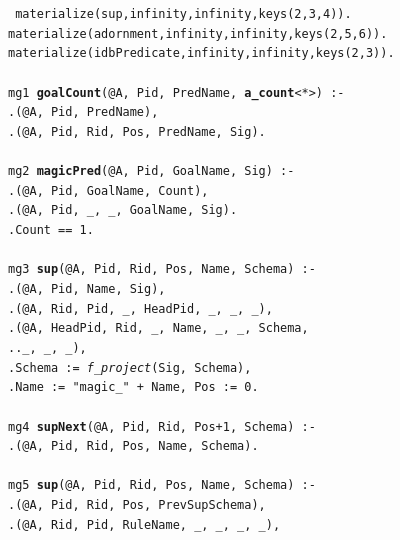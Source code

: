 \documentclass{sigmod08}
\newcommand{\datalogspace}{\textcolor[gray]{1}{.}\hspace{0.5in}}
\begin{document}
\begin{figure}[t]
\begin{boxedminipage}{\linewidth}
\scriptsize{\tt
materialize(sup,infinity,infinity,keys(2,3,4)). \\
materialize(adornment,infinity,infinity,keys(2,5,6)). \\
materialize(idbPredicate,infinity,infinity,keys(2,3)). \\
\\
mg1 {\small \bf goalCount}(@A, Pid, PredName, {\small \bf a\_count}<*>) :- \\
\datalogspace {\small \bf idbPredicate}(@A, Pid, PredName), \\
\datalogspace {\small \bf adornment}(@A, Pid, Rid, Pos, PredName, Sig). \\
\\
mg2 {\small \bf magicPred}(@A, Pid, GoalName, Sig) :- \\
\datalogspace {\small \bf goalCount}(@A, Pid, GoalName, Count), \\
\datalogspace {\small \bf adornment}(@A, Pid, \_, \_, GoalName, Sig). \\
\datalogspace Count == 1. \\
\\
mg3 {\small \bf sup}(@A, Pid, Rid, Pos, Name, Schema) :- \\
\datalogspace {\small \bf magicPred}(@A, Pid, Name, Sig), \\
\datalogspace {\small \bf rule}(@A, Rid, Pid, \_, HeadPid, \_, \_, \_), \\
\datalogspace {\small \bf predicate}(@A, HeadPid, Rid, \_, Name, \_, \_, Schema, \\
\datalogspace \datalogspace \_, \_, \_), \\
\datalogspace Schema := {\em f\_project}(Sig, Schema), \\
\datalogspace Name := "magic\_" + Name, Pos := 0. \\
\\
mg4 {\small \bf supNext}(@A, Pid, Rid, Pos+1, Schema) :- \\
\datalogspace {\small \bf sup}(@A, Pid, Rid, Pos, Name, Schema). \\
\\
mg5 {\small \bf sup}(@A, Pid, Rid, Pos, Name, Schema) :- \\
\datalogspace {\small \bf supNext}(@A, Pid, Rid, Pos, PrevSupSchema),\\
\datalogspace {\small \bf rule}(@A, Rid, Pid, RuleName, \_, \_, \_, \_),\\
}
\end{boxedminipage}
\end{figure}
\end{document}
